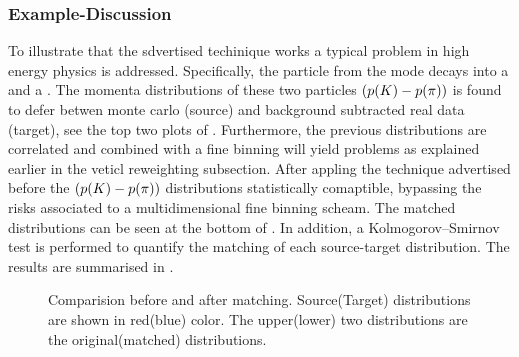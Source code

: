 \subsubsection{Example-Discussion}
To illustrate that the sdvertised techinique works a typical problem in high energy physics is addressed.
Specifically, the \Kstarz particle from the \BsJpsiKst mode decays into a \kaon and a \pion. The momenta
distributions of these two particles $\left( \mbox{$p$}(K)-\mbox{$p$}(\pi) \right)$ is found to defer betwen
monte carlo (source) and background subtracted real data (target), see the top two plots of .
Furthermore, the previous distributions are correlated and combined with a fine binning will yield problems as explained
earlier in the veticl reweighting subsection. After appling the technique advertised before the
$\left( \mbox{$p$}(K)-\mbox{$p$}(\pi) \right)$ distributions statistically comaptible, bypassing the risks associated
to a multidimensional fine binning scheam. The matched distributions can be seen at the bottom of .
In addition, a Kolmogorov–Smirnov test is performed to quantify the matching of each source-target distribution.
The results are summarised in .

\begin{figure}[!t!]
  \centering
  \begin{subfigure}{0.5\textwidth}
    \raggedright
    \scalebox{1.15}{}
    \caption{}
    \label{kplus_rew_original}
  \end{subfigure}%
  \hfill
  \begin{subfigure}{0.5\textwidth}
    \raggedleft
    \scalebox{1.15}{}
    \caption{}
    \label{pminus_rew_original}
  \end{subfigure}
\begin{subfigure}{0.5\textwidth}
    \raggedright
    \scalebox{1.15}{}
    \caption{}
    \label{kplus_rew_matched}
  \end{subfigure}%
  \hfill
  \begin{subfigure}{0.5\textwidth}
    \raggedleft
    \scalebox{1.15}{}
    \caption{}
    \label{pminus_rew_matched}
  \end{subfigure}
  \caption{Comparision before and after matching. Source(Target) distributions are shown in red(blue) color.
   The upper(lower) two distributions are the original(matched) distributions.}
  \label{hor_rew_example_figs}
\end{figure}

